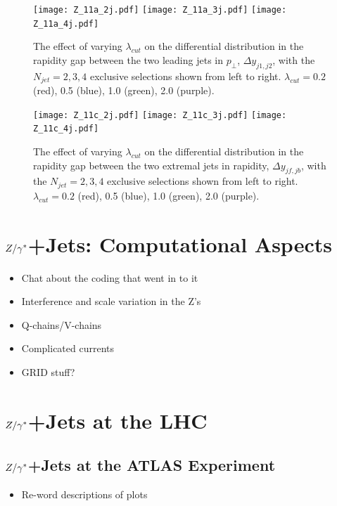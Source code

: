 		\begin{figure}[htp!]
			\centering
			\texttt{[image: Z\_11a\_2j.pdf]}\hfill
			\texttt{[image: Z\_11a\_3j.pdf]}\hfill
			\texttt{[image: Z\_11a\_4j.pdf]}
			\caption{The effect of varying $\lambda_{cut}$ on the differential distribution
			in the rapidity gap between the two leading jets in $p_\perp$, $\Delta y_{j1, j2}$, with the $N_{jet}=2,3,4$
			exclusive selections shown from left to right.  $\lambda_{cut}=0.2$ (red), 0.5 (blue), 1.0 (green), 2.0 (purple).}
			\label{fig:lambdadist}
		\end{figure}

		\begin{figure}[htp!]
			\centering
			\texttt{[image: Z\_11c\_2j.pdf]}\hfill
			\texttt{[image: Z\_11c\_3j.pdf]}\hfill
			\texttt{[image: Z\_11c\_4j.pdf]}
			\caption{The effect of varying $\lambda_{cut}$ on the differential distribution
			in the rapidity gap between the two extremal jets in rapidity, $\Delta y_{jf, jb}$, with the $N_{jet}=2,3,4$
			exclusive selections shown from left to right.  $\lambda_{cut}=0.2$ (red), 0.5 (blue), 1.0 (green), 2.0 (purple).}
			\label{fig:lambdadistdy}
		\end{figure}

	\section{$Z/\gamma^*$+Jets: Computational Aspects}

		\begin{itemize}
			\item Chat about the coding that went in to it
			\item Interference and scale variation in the Z's
			\item Q-chains/V-chains
			\item Complicated currents
			\item GRID stuff?
		\end{itemize}

	\section{$Z/\gamma^*$+Jets at the LHC}

		\subsection{$Z/\gamma^*$+Jets at the ATLAS Experiment}

			\begin{itemize}
				\item Re-word descriptions of plots
			\end{itemize}


